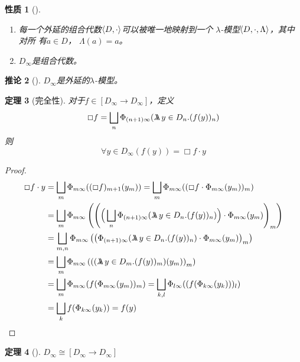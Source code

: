\documentclass[11pt]{article}
\newtheorem{theorem}{定理}[section]
\newtheorem{corollary}[theorem]{推论}
\newtheorem{fact}[theorem]{性质}
\begin{document}
\begin{fact}[]
\begin{enumerate}
\item 每一个外延的组合代数\(\langle D,\cdot\rangle\)可以被唯一地映射到一个 \(\lambda\)-模型\(\langle D,\cdot,\Lambda\rangle\)，其中对所
有\(a\in D\)， \(\Lambda(a)=a\)。
\item \(D_\infty\)是组合代数。
\end{enumerate}
\end{fact}

\begin{corollary}[]
\(D_\infty\)是外延的\(\lambda\)-模型。
\end{corollary}

\begin{theorem}[完全性]
\label{18.2.15}
对于\(f\in[D_\infty\to D_\infty]\)，定义
\begin{equation*}
\Box f=\bigsqcup_n\Phi_{(n+1)\infty}(\metalambda y\in D_n.(f(y))_n)
\end{equation*}
则
\begin{equation*}
\forall y\in D_\infty(f(y))=\Box f\cdot y
\end{equation*}
\end{theorem}

\begin{proof}
\begin{align*}
\Box f\cdot y&=\bigsqcup_m\Phi_{m\infty}((\Box f)_{m+1}(y_m))=\bigsqcup_m\Phi_{m\infty}((\Box f\cdot\Phi_{m\infty}(y_m))_m)\\
&=\bigsqcup_m\Phi_{m\infty}\left( \left(
\Big(\bigsqcup_n\Phi_{(n+1)\infty}(
\metalambda y\in D_n.(f(y))_n)\Big)\cdot\Phi_{m\infty}(y_m)  \right)_m \right)\\
&=\bigsqcup_{m,n}\Phi_{m\infty}\left(
\left(
\Phi_{(n+1)\infty}(\metalambda y\in D_n.(f(y))_n)\cdot\Phi_{m\infty}(y_m)  \right)_m \right)\\
&=\bigsqcup_m\Phi_{m\infty}\left( \left(
(\metalambda y\in D_m.(f(y))_m)(y_m)  \right)_m \right)\\
&=\bigsqcup_m\Phi_{m\infty}(f(\Phi_{m\infty}(y_m))_m)=\bigsqcup_{k,l}\Phi_{l\infty}((f(\Phi_{k\infty}(y_k)))_l)\\
&=\bigsqcup_k f(\Phi_{k\infty}(y_k))=f(y)
\end{align*}
\end{proof}

\begin{theorem}[]
\(D_\infty\cong[D_\infty\to D_\infty]\)
\end{theorem}
\end{document}
